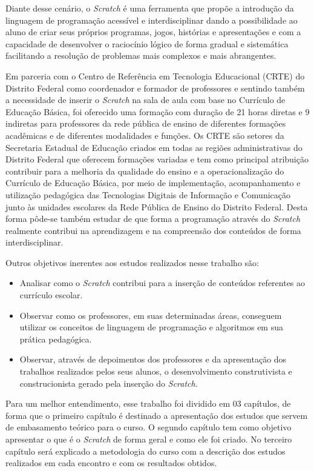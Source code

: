 \documentclass[12pt, openright, a4paper, brazil, english, french, spanish, bibjustif, openany, oneside]{abntex2}
\begin{document}
Diante desse cenário, o \textit{Scratch} é uma ferramenta que propõe a introdução da linguagem de programação acessível e interdisciplinar dando a possibilidade ao aluno de criar seus próprios programas, jogos, histórias e apresentações e com a capacidade de desenvolver o raciocínio lógico de forma gradual e sistemática facilitando a resolução de problemas mais complexos e mais abrangentes.

Em parceria com o Centro de Referência em Tecnologia Educacional (CRTE) do Distrito Federal como coordenador e formador de professores e sentindo também a necessidade de inserir o \textit{Scratch} na sala de aula com base no Currículo de Educação Básica, foi oferecido uma formação com duração de 21 horas diretas e 9 indiretas para professores da rede pública de ensino de diferentes formações acadêmicas e de diferentes modalidades e funções. Os CRTE são setores da Secretaria Estadual de Educação criados em todas as regiões administrativas do Distrito Federal que oferecem formações variadas e tem como principal atribuição contribuir para a melhoria da qualidade  do ensino e a operacionalização do Currículo de Educação Básica, por meio de implementação, acompanhamento e utilização pedagógica das Tecnologias Digitais de Informação e Comunicação junto às unidades escolares da Rede Pública de Ensino do Distrito Federal. Desta forma pôde-se também estudar de que forma a programação através do \textit{Scratch} realmente contribui na aprendizagem e na compreensão dos conteúdos de forma interdisciplinar.

Outros objetivos inerentes aos estudos realizados nesse trabalho são:
\begin{itemize}


\item Analisar como o \textit{Scratch} contribui para a inserção de conteúdos referentes ao currículo escolar.
\item Observar como os professores, em suas determinadas áreas, conseguem utilizar os conceitos de linguagem de programação e algoritmos em sua prática pedagógica.
\item Observar, através de depoimentos dos professores e da apresentação dos trabalhos realizados pelos seus alunos, o desenvolvimento construtivista e construcionista gerado pela inserção do \textit{Scratch}.

\end{itemize}

Para um melhor entendimento, esse trabalho foi dividido em 03 capítulos, de forma que o primeiro capítulo é destinado a apresentação dos estudos que servem de embasamento teórico para o curso. O segundo capítulo tem como objetivo apresentar o que é o \textit{Scratch} de forma geral e como ele foi criado. No terceiro capítulo será explicado a metodologia do curso com a descrição dos estudos realizados em cada encontro e com os resultados obtidos.
\end{document}
